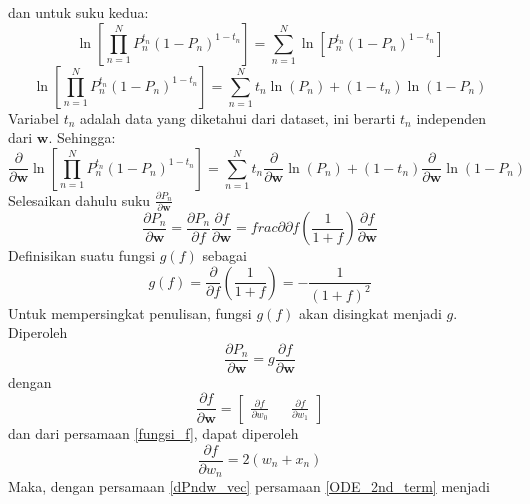 dan untuk suku kedua:
\begin{equation*}
    \ln{\left[ \prod_{n=1}^{N} P_n^{t_n}\left(1-P_n\right)^{1-t_n} \right] }=\sum_{n=1}^{N} \ln{ \left[ P_n^{t_n}\left(1-P_n\right)^{1-t_n} \right] }
\end{equation*}
\begin{equation*}
    \ln{\left[ \prod_{n=1}^{N} P_n^{t_n}\left(1-P_n\right)^{1-t_n} \right] }=\sum_{n=1}^{N} t_n\ln{(P_n)} + (1-t_n)\ln{(1-P_n)}
\end{equation*}
Variabel $t_n$ adalah data yang diketahui dari dataset, ini berarti $t_n$ independen dari $\mathbf{w}$. Sehingga:
\begin{equation}
    \frac{\partial}{\partial{\mathbf{w}}} \ln{\left[ \prod_{n=1}^{N} P_n^{t_n}\left(1-P_n\right)^{1-t_n} \right] } = \sum_{n=1}^{N} t_n \frac{\partial}{\partial{\mathbf{w}}}\ln{(P_n)} + (1-t_n) \frac{\partial}{\partial{\mathbf{w}}} \ln{(1-P_n)} \label{ODE_2nd_term}
\end{equation}
Selesaikan dahulu suku $\frac{\partial{P_n}}{\partial{\mathbf{w}}}$
\begin{equation*}
    \frac{\partial{P_n}}{\partial{\mathbf{w}}} = \frac{\partial{P_n}}{\partial{f}} \frac{\partial{f}}{\partial{\mathbf{w}}} = frac{\partial}{\partial{f}} \left( \frac{1}{1+f} \right) \frac{\partial{f}}{\partial{\mathbf{w}}}
\end{equation*}
Definisikan suatu fungsi $g(f)$ sebagai
\begin{equation}
    g(f) = \frac{\partial}{\partial{f}} \left( \frac{1}{1+f} \right) = -\frac{1}{(1+f)^2} \label{fungsi_g}
\end{equation}
Untuk mempersingkat penulisan, fungsi $g(f)$ akan disingkat menjadi $g$. Diperoleh
\begin{equation}
    \frac{\partial{P_n}}{\partial{\mathbf{w}}} = g \frac{\partial{f}}{\partial{\mathbf{w}}} \label{dPndw_vec}
\end{equation}
dengan
\begin{equation}
    \frac{\partial{f}}{\partial{\mathbf{w}}} = \begin{bmatrix} \frac{\partial{f}}{\partial{w_0}} && \frac{\partial{f}}{\partial{w_1}}\end{bmatrix} \label{dfdw_vec}
\end{equation}
dan dari persamaan \ref{fungsi_f}, dapat diperoleh
\begin{equation}
    \frac{\partial{f}}{\partial{w_n}} = 2(w_n+x_n) \label{dfdwn}
\end{equation}
Maka, dengan persamaan \ref{dPndw_vec} persamaan \ref{ODE_2nd_term} menjadi
